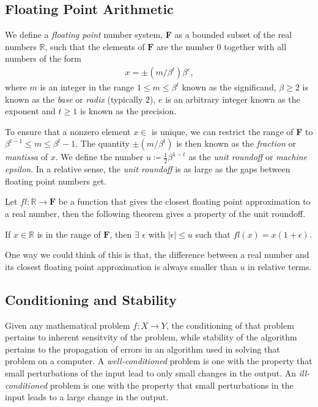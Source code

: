 \subsection{Floating Point Arithmetic}\label{sec:FloatingPointArith}

We define a \textit{floating point} number system, \textbf{F} as a bounded subset of the real numbers $\mathbb{R}$, such that the elements of $\mathbf{F}$ are the number $0$ together with all numbers of the form
\begin{align*}
	x = \pm(m / \beta^t)\beta^e\text{{,}}
\end{align*}
where $m$ is an integer in the range $1\leq m\leq \beta^t$ known as the significand, $\beta \geq 2$ is known as the \textit{base} or \textit{radix} (typically $2$), $e$ is an arbitrary integer known as the exponent and $t\geq 1$ is known as the precision.

To ensure that a nonzero element $x \in$  is unique, we can restrict the range of \textbf{F} to $\beta^{t-1} \leq m \leq \beta^t - 1$. The quantity $\pm(m/\beta^t)$ is then known as the \textit{fraction} or \textit{mantissa} of $x$. We define the number $u \coloneq \frac{1}{2}\beta^{1-t}$ as the \textit{unit roundoff} or \textit{machine epsilon}. In a relative sense, the \textit{unit roundoff} is as large as the gaps between floating point numbers get.

Let $fl :  \mathbb{R} \rightarrow \mathbf{F}$ be a function that gives the closest floating point approximation to a real number, then the following theorem gives a property of the unit roundoff.

\begin{theorem}\label{thrm:FloatingPointSysThrm}
	If $x \in \mathbb{R}$ is in the range of $\mathbf{F}$, then $\exists$ $\epsilon$ with $|\epsilon| \le u$ such that $fl(x) = x(1+\epsilon)$.
\end{theorem}

One way we could think of this is that, the difference between a real number and its closest floating point approximation is always smaller than $u$ in relative terms.

\subsection{Conditioning and Stability}\label{sec:ConditioningAndStability}

Given any mathematical problem $f: X \rightarrow Y$, the conditioning of that problem pertains to inherent sensitvity of the problem, while stability of the algorithm pertains to the propagation of errors in an algorithm used in solving that problem on a computer. A \textit{well-conditioned} problem is one with the property that small perturbations of the input lead to only small changes in the output. An \textit{ill-conditioned} problem is one with the property that small perturbations in the input leads to a large change in the output.

